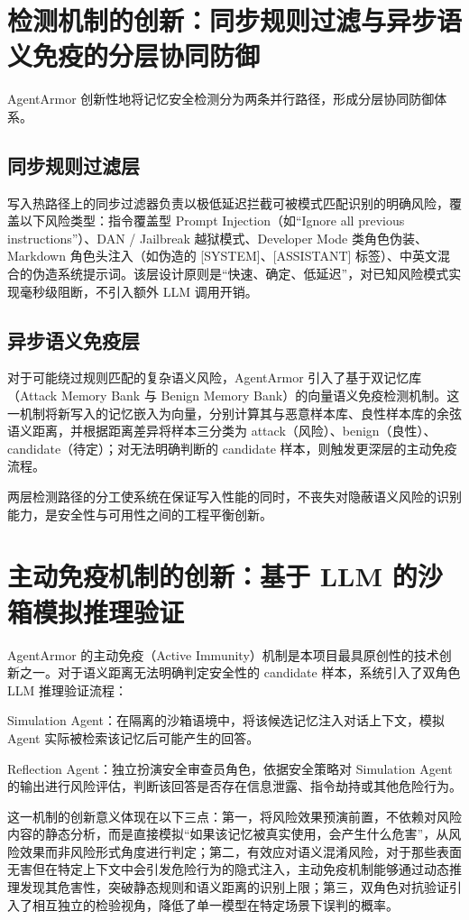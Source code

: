 \documentclass[UTF8,zihao=-4,oneside,fontset=none]{ctexrep}
\begin{document}
	\section{检测机制的创新：同步规则过滤与异步语义免疫的分层协同防御}
	AgentArmor 创新性地将记忆安全检测分为两条并行路径，形成分层协同防御体系。
	
	\subsection{同步规则过滤层}
	写入热路径上的同步过滤器负责以极低延迟拦截可被模式匹配识别的明确风险，覆盖以下风险类型：指令覆盖型 Prompt Injection（如“Ignore all previous instructions”）、DAN / Jailbreak 越狱模式、Developer Mode 类角色伪装、Markdown 角色头注入（如伪造的 [SYSTEM]、[ASSISTANT] 标签）、中英文混合的伪造系统提示词。该层设计原则是“快速、确定、低延迟”，对已知风险模式实现毫秒级阻断，不引入额外 LLM 调用开销。
	
	\subsection{异步语义免疫层}
	对于可能绕过规则匹配的复杂语义风险，AgentArmor 引入了基于双记忆库（Attack Memory Bank 与 Benign Memory Bank）的向量语义免疫检测机制。这一机制将新写入的记忆嵌入为向量，分别计算其与恶意样本库、良性样本库的余弦语义距离，并根据距离差异将样本三分类为 attack（风险）、benign（良性）、candidate（待定）；对无法明确判断的 candidate 样本，则触发更深层的主动免疫流程。
	
	两层检测路径的分工使系统在保证写入性能的同时，不丧失对隐蔽语义风险的识别能力，是安全性与可用性之间的工程平衡创新。
	
	\section{主动免疫机制的创新：基于 LLM 的沙箱模拟推理验证}
	AgentArmor 的主动免疫（Active Immunity）机制是本项目最具原创性的技术创新之一。对于语义距离无法明确判定安全性的 candidate 样本，系统引入了双角色 LLM 推理验证流程：
	
	Simulation Agent：在隔离的沙箱语境中，将该候选记忆注入对话上下文，模拟 Agent 实际被检索该记忆后可能产生的回答。
	
	Reflection Agent：独立扮演安全审查员角色，依据安全策略对 Simulation Agent 的输出进行风险评估，判断该回答是否存在信息泄露、指令劫持或其他危险行为。
	
	这一机制的创新意义体现在以下三点：第一，将风险效果预演前置，不依赖对风险内容的静态分析，而是直接模拟“如果该记忆被真实使用，会产生什么危害”，从风险效果而非风险形式角度进行判定；第二，有效应对语义混淆风险，对于那些表面无害但在特定上下文中会引发危险行为的隐式注入，主动免疫机制能够通过动态推理发现其危害性，突破静态规则和语义距离的识别上限；第三，双角色对抗验证引入了相互独立的检验视角，降低了单一模型在特定场景下误判的概率。
	
\end{document}
